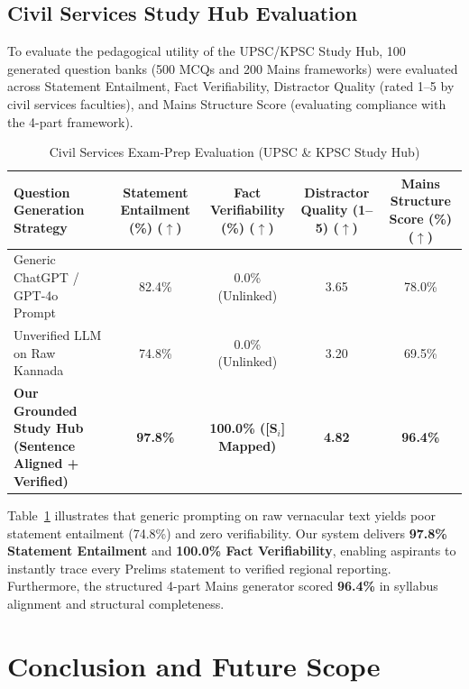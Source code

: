\documentclass[conference]{IEEEtran}
\begin{document}
\subsection{Civil Services Study Hub Evaluation}
To evaluate the pedagogical utility of the UPSC/KPSC Study Hub, 100 generated question banks (500 MCQs and 200 Mains frameworks) were evaluated across Statement Entailment, Fact Verifiability, Distractor Quality (rated 1--5 by civil services faculties), and Mains Structure Score (evaluating compliance with the 4-part framework).

\begin{table}[t]
\caption{Civil Services Exam-Prep Evaluation (UPSC \& KPSC Study Hub)}
\label{tab:exam_prep_results}
\centering
\begin{tabularx}{\textwidth}{@{} X c c c c @{}}
\toprule
\textbf{Question Generation Strategy} & \textbf{Statement Entailment (\%) ($\uparrow$)} & \textbf{Fact Verifiability (\%) ($\uparrow$)} & \textbf{Distractor Quality (1--5) ($\uparrow$)} & \textbf{Mains Structure Score (\%) ($\uparrow$)} \\
\midrule
Generic ChatGPT / GPT-4o Prompt & 82.4\% & 0.0\% (Unlinked) & 3.65 & 78.0\% \\
Unverified LLM on Raw Kannada & 74.8\% & 0.0\% (Unlinked) & 3.20 & 69.5\% \\
\midrule
\textbf{Our Grounded Study Hub (Sentence Aligned + Verified)} & \textbf{97.8\%} & \textbf{100.0\% ([S$_i$] Mapped)} & \textbf{4.82} & \textbf{96.4\%} \\
\bottomrule
\end{tabularx}
\end{table}

Table~\ref{tab:exam_prep_results} illustrates that generic prompting on raw vernacular text yields poor statement entailment (74.8\%) and zero verifiability. Our system delivers \textbf{97.8\% Statement Entailment} and \textbf{100.0\% Fact Verifiability}, enabling aspirants to instantly trace every Prelims statement to verified regional reporting. Furthermore, the structured 4-part Mains generator scored \textbf{96.4\%} in syllabus alignment and structural completeness.

\section{Conclusion and Future Scope}
\label{sec:conclusion}
\end{document}
